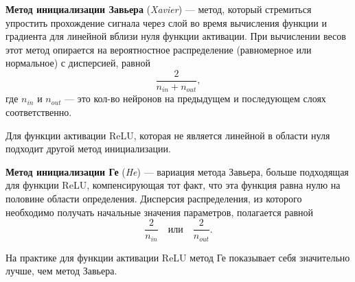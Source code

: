 \begin{definition}
    \textbf{Метод инициализации Завьера} (\textit{Xavier}) --- метод, который стремиться упростить прохождение сигнала через слой во время вычисления функции и градиента для линейной вблизи нуля функции активации. При вычислении весов этот метод опирается на вероятностное распределение (равномерное или нормальное) с дисперсией, равной
    \[
        \dfrac{2}{n_{in} + n_{out}},
    \]
    где $n_{in}$ и $n_{out}$ --- это кол-во нейронов на предыдущем и последующем слоях соответственно.
\end{definition}

Для функции активации ReLU, которая не является линейной в области нуля подходит другой метод инициализации.

\begin{definition}
    \textbf{Метод инициализации Ге} (\textit{He}) --- вариация метода Завьера, больше подходящая для функции ReLU, компенсирующая тот факт, что эта функция равна нулю на половине области определения. Дисперсия распределения, из которого необходимо получать начальные значения параметров, полагается равной
    \[
        \dfrac{2}{n_{in}}\quad\text{или}\quad\dfrac{2}{n_{out}}.
    \]
\end{definition}

\begin{remark}
    На практике для функции активации ReLU метод Ге показывает себя значительно лучше, чем метод Завьера.
\end{remark}